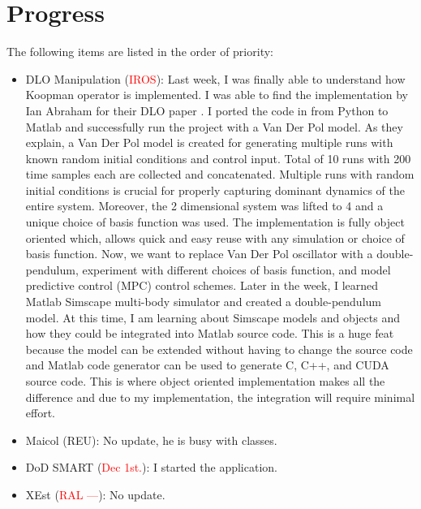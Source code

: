 \documentclass[11pt]{article}
\begin{document}
\section{Progress}
The following items are listed in the order of priority:
\begin{itemize}
    \item DLO Manipulation (\textcolor{red}{IROS}):
    Last week, I was finally able to understand how Koopman operator is
    implemented. I was able to find the implementation by Ian Abraham for
    their DLO paper \cite{abraham2017model}. I ported the code in from Python
    to Matlab and successfully run the project with a Van Der Pol model. As they
    explain, a Van Der Pol model is created for generating multiple runs with
    known random initial conditions and control input. Total of 10 runs with
    200 time samples each are collected and concatenated. Multiple runs with
    random initial conditions is crucial for properly capturing dominant dynamics
    of the entire system. Moreover, the 2 dimensional system was lifted to 4
    and a unique choice of basis function was used. The implementation is
    fully object oriented which, allows quick and easy reuse with any simulation
    or choice of basis function. Now, we want to replace Van Der Pol oscillator
    with a double-pendulum, experiment with different choices of basis function,
    and model predictive control (MPC) control schemes.
    Later in the week, I learned Matlab Simscape multi-body simulator and
    created a double-pendulum model.
    At this time, I am learning about Simscape models and objects and how they
    could be integrated into Matlab source code. This is a huge feat because
    the model can be extended without having to change the source code and
    Matlab code generator can be used to generate C, C++, and CUDA source code.
    This is where object oriented implementation makes all the difference and
    due to my implementation, the integration will require minimal effort.\\
    \item Maicol (REU): No update, he is busy with classes.\\
    \item DoD SMART (\textcolor{red}{Dec 1st.}): I started the application.\\
    \item XEst (\textcolor{red}{RAL ---}): No update.\\
  \end{itemize}
\newpage

\newpage


\end{document}
